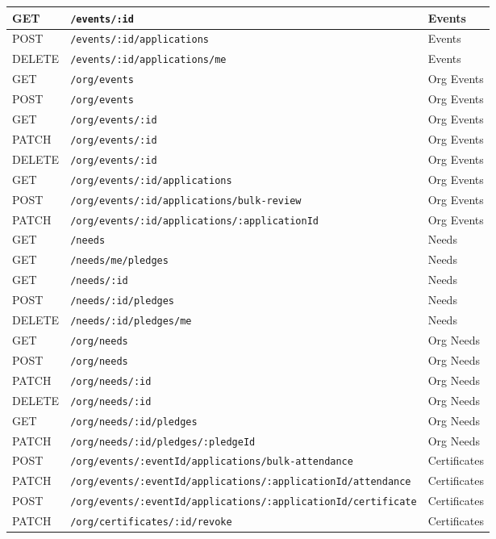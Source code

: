 \begin{longtable}{|p{}|p{}|p{}|}
GET & \texttt{/events/:id} & Events\\\hline
POST & \texttt{/events/:id/applications} & Events\\\hline
DELETE & \texttt{/events/:id/applications/me} & Events\\\hline
GET & \texttt{/org/events} & Org Events\\\hline
POST & \texttt{/org/events} & Org Events\\\hline
GET & \texttt{/org/events/:id} & Org Events\\\hline
PATCH & \texttt{/org/events/:id} & Org Events\\\hline
DELETE & \texttt{/org/events/:id} & Org Events\\\hline
GET & \texttt{/org/events/:id/applications} & Org Events\\\hline
POST & \texttt{/org/events/:id/applications/bulk-review} & Org Events\\\hline
PATCH & \texttt{/org/events/:id/applications\allowbreak/:applicationId} & Org Events\\\hline
GET & \texttt{/needs} & Needs\\\hline
GET & \texttt{/needs/me/pledges} & Needs\\\hline
GET & \texttt{/needs/:id} & Needs\\\hline
POST & \texttt{/needs/:id/pledges} & Needs\\\hline
DELETE & \texttt{/needs/:id/pledges/me} & Needs\\\hline
GET & \texttt{/org/needs} & Org Needs\\\hline
POST & \texttt{/org/needs} & Org Needs\\\hline
PATCH & \texttt{/org/needs/:id} & Org Needs\\\hline
DELETE & \texttt{/org/needs/:id} & Org Needs\\\hline
GET & \texttt{/org/needs/:id/pledges} & Org Needs\\\hline
PATCH & \texttt{/org/needs/:id/pledges/:pledgeId} & Org Needs\\\hline
POST & \texttt{/org/events/:eventId\allowbreak/applications\allowbreak/bulk-attendance} & Certificates\\\hline
PATCH & \texttt{/org/events/:eventId\allowbreak/applications\allowbreak/:applicationId\allowbreak/attendance} & Certificates\\\hline
POST & \texttt{/org/events/:eventId\allowbreak/applications\allowbreak/:applicationId\allowbreak/certificate} & Certificates\\\hline
PATCH & \texttt{/org/certificates/:id/revoke} & Certificates\\\hline

\end{longtable}
